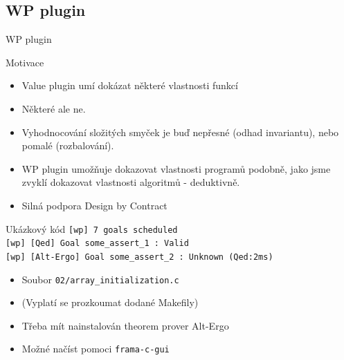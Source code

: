 \documentclass[11pt]{beamer}
\begin{document}
\subsection{WP plugin}

\begin{frame}{WP plugin}

\end{frame}


\begin{frame}{Motivace}
	\begin{itemize}
		\item Value plugin umí dokázat některé vlastnosti funkcí
		\pause \item Některé ale ne.
		\item Vyhodnocování složitých smyček je buď nepřesné
			(odhad invariantu), nebo pomalé (rozbalování).
		\item WP plugin umožňuje dokazovat vlastnosti programů podobně, jako jsme zvyklí dokazovat vlastnosti algoritmů - deduktivně.
		\item Silná podpora Design by Contract
	\end{itemize}
\end{frame}



\begin{frame}{Ukázkový kód}
	\lstExIIwpBash
	\texttt{[wp] 7 goals scheduled}\\
	\texttt{[wp] [Qed] Goal some\_assert\_1 : Valid} \\
	\texttt{[wp] [Alt-Ergo] Goal some\_assert\_2 : Unknown (Qed:2ms)}
	\begin{itemize}
		\item Soubor \texttt{02/array\_initialization.c}
		\item (Vyplatí se prozkoumat dodané Makefily)
		\item Třeba mít nainstalován theorem prover Alt-Ergo
		\item Možné načíst pomoci \texttt{frama-c-gui}
	\end{itemize}
\end{frame}

\end{document}
